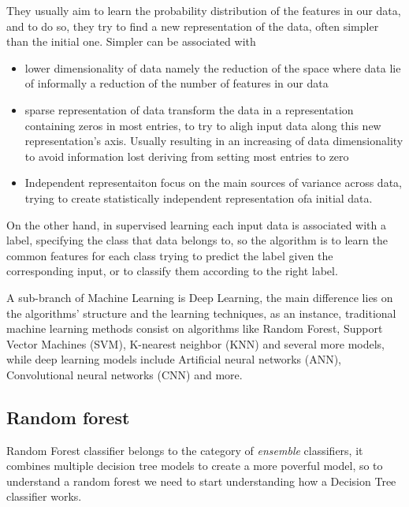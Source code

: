 \documentclass[a4paper,11pt]{article}
\begin{document}
They usually aim to learn the probability distribution of the features in our data, and to do so, they try to find a new representation of the data, often simpler than the initial one.
Simpler can be associated with
\begin{itemize}
\item lower dimensionality of data namely the reduction of the space where data lie of informally a reduction of the number of features in our data
\item sparse representation of data transform the data in a representation containing zeros in most entries, to try to aligh input data along this new  representation's axis. Usually resulting in an increasing of data dimensionality to avoid information lost deriving from setting most entries to zero
\item Independent representaiton focus on the main sources of variance across data, trying to create statistically independent representation ofa initial data.
\end{itemize}

On the other hand, in supervised learning each input data is associated with a label, specifying the class that data belongs to, so the algorithm is to learn the common features for each class trying to predict the label given the corresponding input, or to classify them according to the right label.

A sub-branch of Machine Learning is Deep Learning, the main difference lies on the algorithms' structure and the learning techniques, as an instance, traditional machine learning methods consist on algorithms like Random Forest, Support Vector Machines (SVM), K-nearest neighbor (KNN) and several more models, while deep learning models include Artificial neural networks (ANN), Convolutional neural networks (CNN) and more.

\subsection{Random forest}
Random Forest classifier belongs to the category of \emph{ensemble} classifiers, it combines multiple decision tree models to create a more poverful model, so to understand a random forest we need to start understanding how a Decision Tree classifier works.
\end{document}
